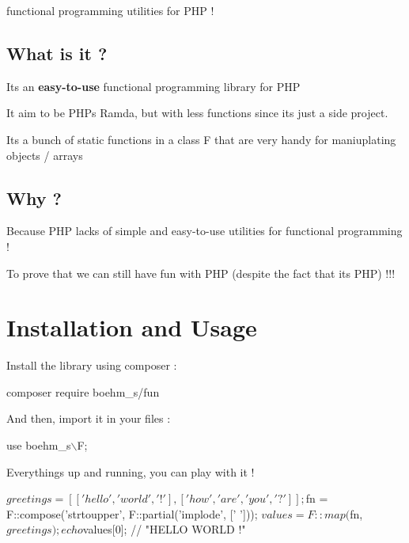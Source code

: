 functional programming utilities for P\+HP !

\subsection*{What is it ?}


\begin{DoxyItemize}
\item It\textquotesingle{}s an {\bfseries easy-\/to-\/use} functional programming library for P\+HP
\item It aim to be P\+HP\textquotesingle{}s Ramda, but with less functions since it\textquotesingle{}s just a side project.
\item It\textquotesingle{}s a bunch of static functions in a class {\ttfamily F} that are very handy for maniuplating objects / arrays
\end{DoxyItemize}

\subsection*{Why ?}


\begin{DoxyItemize}
\item Because P\+HP lacks of simple and easy-\/to-\/use utilities for functional programming !
\item To prove that we can still have fun with P\+HP (despite the fact that it\textquotesingle{}s P\+HP) !!!
\end{DoxyItemize}

\section*{Installation and Usage}

Install the library using composer \+:


\begin{DoxyCode}
composer require boehm\_s/fun
\end{DoxyCode}


And then, import it in your files \+:


\begin{DoxyCode}
use boehm\_s\(\backslash\)F;
\end{DoxyCode}


Everything\textquotesingle{}s up and running, you can play with it !


\begin{DoxyCode}
$greetings = [
    ['hello', 'world', '!'],
    ['how', 'are', 'you', '?']
];

$fn = F::compose('strtoupper', F::partial('implode', [' ']));
$values = F::map($fn, $greetings);

echo $values[0]; // "HELLO WORLD !"
\end{DoxyCode}



